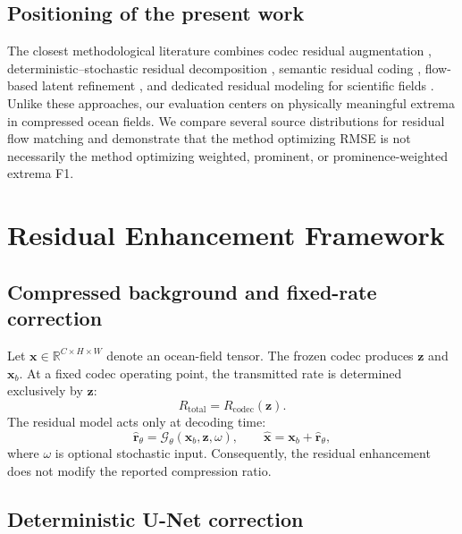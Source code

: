 \documentclass[11pt]{article}
\newcommand{\x}{\mathbf{x}}
\newcommand{\xb}{\mathbf{x}_{b}}
\newcommand{\xh}{\widehat{\mathbf{x}}}
\newcommand{\z}{\mathbf{z}}
\newcommand{\rh}{\widehat{\mathbf{r}}_{\theta}}
\begin{document}
\subsection{Positioning of the present work}

The closest methodological literature combines codec residual augmentation \cite{ghouse2023residual}, deterministic--stochastic residual decomposition \cite{liu2024residual}, semantic residual coding \cite{ke2025ultra}, flow-based latent refinement \cite{huang2026flowcodec}, and dedicated residual modeling for scientific fields \cite{zhu2026residual}. Unlike these approaches, our evaluation centers on physically meaningful extrema in compressed ocean fields. We compare several source distributions for residual flow matching and demonstrate that the method optimizing RMSE is not necessarily the method optimizing weighted, prominent, or prominence-weighted extrema F1.

\section{Residual Enhancement Framework}

\subsection{Compressed background and fixed-rate correction}

Let $\x\in\mathbb{R}^{C\times H\times W}$ denote an ocean-field tensor. The frozen codec produces $\z$ and $\xb$. At a fixed codec operating point, the transmitted rate is determined exclusively by $\z$:
\begin{equation}
    R_{\mathrm{total}}=R_{\mathrm{codec}}(\z).
\end{equation}
The residual model acts only at decoding time:
\begin{equation}
    \rh=\mathcal{G}_{\theta}(\xb,\z,\omega),
    \qquad
    \xh=\xb+\rh,
\end{equation}
where $\omega$ is optional stochastic input. Consequently, the residual enhancement does not modify the reported compression ratio.

\subsection{Deterministic U-Net correction}
\end{document}

